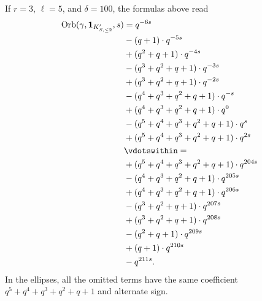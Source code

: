 \begin{example}
  If $r=3$, $\ell=5$, and $\delta=100$, the formulas above read
  \begin{align*}
  \Orb(\gamma, \mathbf{1}_{K'_{S, \le 2}}, s)
  &= q^{-6s} \\
  &- (q+1) \cdot q^{-5s} \\
  &+ (q^2+q+1) \cdot q^{-4s} \\
  &- (q^3+q^2+q+1) \cdot q^{-3s} \\
  &+ (q^3+q^2+q+1) \cdot q^{-2s} \\
  &- (q^4+q^3+q^2+q+1) \cdot q^{-s} \\
  &+ (q^4+q^3+q^2+q+1) \cdot q^{0} \\
  &- (q^5+q^4+q^3+q^2+q+1) \cdot q^{s} \\
  &+ (q^5+q^4+q^3+q^2+q+1) \cdot q^{2s} \\
  &\vdotswithin= \\
  &+ (q^5+q^4+q^3+q^2+q+1) \cdot q^{204s} \\
  &- (q^4+q^3+q^2+q+1) \cdot q^{205s} \\
  &+ (q^4+q^3+q^2+q+1) \cdot q^{206s} \\
  &- (q^3+q^2+q+1) \cdot q^{207s} \\
  &+ (q^3+q^2+q+1) \cdot q^{208s} \\
  &- (q^2+q+1) \cdot q^{209s} \\
  &+ (q+1) \cdot q^{210s} \\
  &- q^{211s}.
  \end{align*}
  In the ellipses, all the omitted terms
  have the same coefficient $q^5+q^4+q^3+q^2+q+1$
  and alternate sign.
\end{example}

